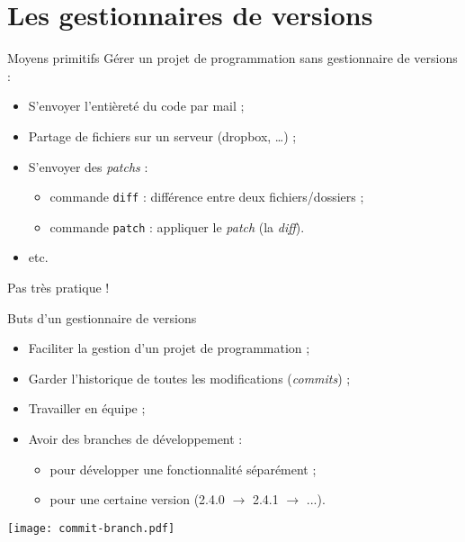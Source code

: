 \section{Les gestionnaires de versions}
\begin{frame}
  \tableofcontents[sectionstyle=show/shaded]
\end{frame}

\usebackgroundtemplate{}

\begin{frame}{Moyens primitifs}
Gérer un projet de programmation sans gestionnaire de versions :
\begin{itemize}
  \item S'envoyer l'entièreté du code par mail ;
  \item Partage de fichiers sur un serveur (dropbox, …) ;
  \item S'envoyer des \textit{patchs} :
  \begin{itemize}
    \item commande \texttt{diff} : différence entre deux fichiers/dossiers ;
    \item commande \texttt{patch} : appliquer le \textit{patch} (la \textit{diff}).
  \end{itemize}
  \item etc.
\end{itemize}

\pause
\bigskip
Pas très pratique !
\end{frame}

\begin{frame}{Buts d'un gestionnaire de versions}
  \begin{itemize}
    \item Faciliter la gestion d'un projet de programmation ;
    \item Garder l'historique de toutes les modifications (\textit{commits}) ;
    \item Travailler en équipe ;
    \item Avoir des branches de développement :
      \begin{itemize}
        \item pour développer une fonctionnalité séparément ;
        \item pour une certaine version (2.4.0 $\rightarrow$ 2.4.1 $\rightarrow$ ...).
      \end{itemize}
  \end{itemize}

  \bigskip
  \begin{center}
    \texttt{[image: commit-branch.pdf]}
  \end{center}
\end{frame}


